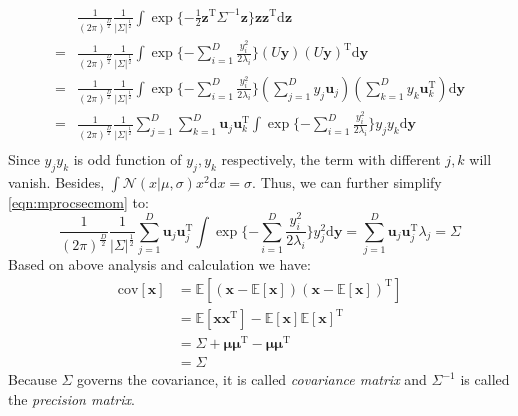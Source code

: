 \begin{equation}
\begin{split}
&\frac{1}{(2\pi)^{\frac{D}{2}}}\frac{1}{\vert{}\Sigma\vert^{\frac{1}{2}}}\int{}\exp{}\{-\frac{1}{2}\mathbf{z}^{\mathrm{T}}\Sigma^{-1}\mathbf{z}\}\mathbf{z}\mathbf{z}^{\mathrm{T}}\text{d}\mathbf{z}\\
=&\frac{1}{(2\pi)^{\frac{D}{2}}}\frac{1}{\vert{}\Sigma\vert^{\frac{1}{2}}}\int{}\exp{}\{-\sum_{i=1}^{D}\frac{y_{i}^2}{2\lambda_{i}}\}(U\mathbf{y})(U\mathbf{y})^{\mathrm{T}}\text{d}\mathbf{y}\\
=&\frac{1}{(2\pi)^{\frac{D}{2}}}\frac{1}{\vert{}\Sigma\vert^{\frac{1}{2}}}\int{}\exp{}\{-\sum_{i=1}^{D}\frac{y_{i}^2}{2\lambda_{i}}\}(\sum_{j=1}^{D}y_{j}\mathbf{u}_{j})(\sum_{k=1}^{D}y_{k}\mathbf{u}_{k}^{\mathrm{T}})\text{d}\mathbf{y}\\
=&\frac{1}{(2\pi)^{\frac{D}{2}}}\frac{1}{\vert{}\Sigma\vert^{\frac{1}{2}}}\sum_{j=1}^{D}\sum_{k=1}^{D}\mathbf{u}_{j}\mathbf{u}_{k}^{\mathrm{T}}\int{}\exp{}\{-\sum_{i=1}^{D}\frac{y_{i}^2}{2\lambda_{i}}\}y_{j}y_{k}\text{d}\mathbf{y}\\
\end{split}
\label{eqn:mprocsecmom}
\end{equation}
Since $y_{j}y_{k}$ is odd function of $y_{j},y_{k}$ respectively, the
term with different $j,k$ will vanish. Besides,
     $\int{}\mathcal{N}(x\vert{}\mu,\sigma)x^{2}\text{d}x=\sigma$.
     Thus, we can further simplify \eqref{eqn:mprocsecmom} to:
\begin{equation}
\frac{1}{(2\pi)^{\frac{D}{2}}}\frac{1}{\vert{}\Sigma\vert^{\frac{1}{2}}}\sum_{j=1}^{D}\mathbf{u}_{j}\mathbf{u}_{j}^{\mathrm{T}}\int{}\exp{}\{-\sum_{i=1}^{D}\frac{y_{i}^2}{2\lambda_{i}}\}y_{j}^{2}\text{d}\mathbf{y}=\sum_{j=1}^{D}\mathbf{u}_{j}\mathbf{u}_{j}^{\mathrm{T}}\lambda_{j}=\Sigma
\label{eqn:gaussiansecmm}
\end{equation}
Based on above analysis and calculation we have:
\begin{equation}
\begin{split}
\text{cov}[\mathbf{x}]&=\mathbb{E}[(\mathbf{x}-\mathbb{E}[\mathbf{x}])(\mathbf{x}-\mathbb{E}[\mathbf{x}])^{\mathrm{T}}]\\
&=\mathbb{E}[\mathbf{x}\mathbf{x}^{\mathrm{T}}]-\mathbb{E}[\mathbf{x}]\mathbb{E}[\mathbf{x}]^{\mathrm{T}}\\
&=\Sigma+\boldsymbol{\mu}\boldsymbol{\mu}^{\mathrm{T}}-\boldsymbol{\mu}\boldsymbol{\mu}^{\mathrm{T}}\\
&=\Sigma
\end{split}
\label{eqn:gaussiancov}
\end{equation}
Because $\Sigma$ governs the covariance, it is called \emph{covariance
    matrix} and $\Sigma^{-1}$ is called the \emph{precision matrix}.





